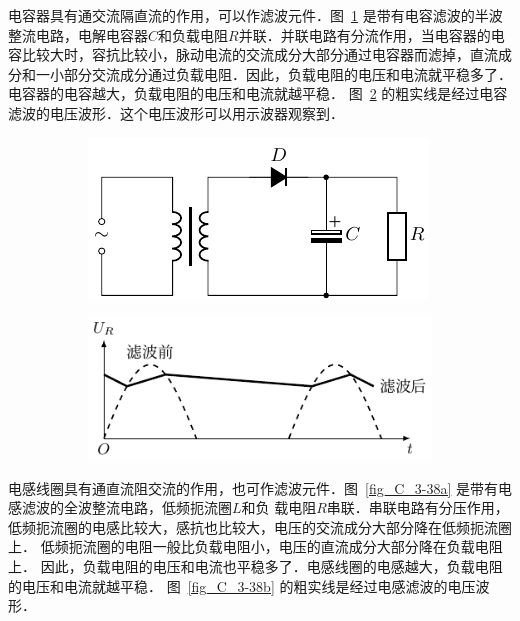 电容器具有通交流隔直流的作用，可以作滤波元件．图~\ref{fig_C_3-37a} 是带有电容滤波的半波整流电路，电解电容器$C$和负载电阻$R$并联．并联电路有分流作用，当电容器的电容比较大时，容抗比较小，脉动电流的交流成分大部分通过电容器而滤掉，直流成分和一小部分交流成分通过负载电阻．因此，负载电阻的电压和电流就平稳多了．电容器的电容越大，负载电阻的电压和电流就越平稳．
图~\ref{fig_C_3-37b} 的粗实线是经过电容滤波的电压波形．这个电压波形可以用示波器观察到．
\begin{figure}[htbp]
    \centering
    \begin{subfigure}{0.4\linewidth}
        \centering
        \includegraphics{fig/C/3-37a.pdf}
        \caption{}\label{fig_C_3-37a}
    \end{subfigure}
    \hfil
    \begin{subfigure}{0.4\linewidth}
        \centering
        \includegraphics{fig/C/3-37b.pdf}
        \caption{}\label{fig_C_3-37b}
    \end{subfigure}
    \caption{}\label{fig_C_3-37}
\end{figure}



电感线圈具有通直流阻交流的作用，也可作滤波元件．图~\ref{fig_C_3-38a} 是带有电感滤波的全波整流电路，低频扼流圈$L$和负
载电阻$R$串联．串联电路有分压作用，低频扼流圈的电感比较大，感抗也比较大，电压的交流成分大部分降在低频扼流圈上．
低频扼流圈的电阻一般比负载电阻小，电压的直流成分大部分降在负载电阻上．
因此，负载电阻的电压和电流也平稳多了．电感线圈的电感越大，负载电阻的电压和电流就越平稳．
图~\ref{fig_C_3-38b} 的粗实线是经过电感滤波的电压波形．

